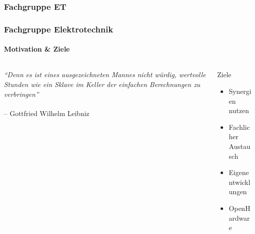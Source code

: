 \subsubsection{Fachgruppe ET}
\begin{frame}
	\frametitle{Fachgruppe Elektrotechnik\hfill{}\footnotesize \group}
	\framesubtitle{Motivation \& Ziele}
	\begin{columns}
		\begin{column}{0.5\textwidth}
				\textit{``Denn es ist eines ausgezeichneten
					Mannes nicht würdig, wertvolle Stunden
					wie ein Sklave im Keller der einfachen
					Berechnungen zu verbringen''}
				~ \\ ~ \\
				\hfill{} -- Gottfried Wilhelm Leibniz \\
		\end{column}
		\pause
		\begin{column}{0.5\textwidth}
			\begin{block}{Ziele}
				\begin{itemize}
					\item Synergien nutzen
					\item Fachlicher Austausch
					\item Eigenentwicklungen
					\item OpenHardware
				\end{itemize}
			\end{block}
		\end{column}
	\end{columns}
\end{frame}

